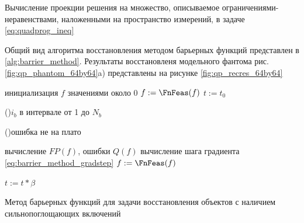 \begin{algorithm}[H]

\vspace{0.5cm}
\vspace{0.5cm}

 \caption{Вычисление проекции решения на множество, описываемое ограничениями-неравенствами, наложенными на пространство измерений, в задаче \eqref{eq:quadprog_ineq}}
 \label{alg:hough_barrier_projection}
\end{algorithm}

Общий вид алгоритма восстановления методом барьерных функций представлен в \ref{alg:barrier_method}.
Результаты восстановленя модельного фантома рис. \ref{fig:qp_phantom_64by64}a) представлены на рисунке \ref{fig:qp_recres_64by64}

\begin{algorithm}[H]
\vspace{0.5cm}



 инициализация $f$ значениями около 0 \;
 $f := \FnFeas(f)$ \;
 $t := t_0$ \;

 \For(){$i_b$ в интервале от 1 до $N_b$}{
  \While(){ошибка не на плато}{

  вычисление $FP(f)$, ошибки $Q(f)$ \;
  вычисление шага градиента \eqref{eq:barrier_method_gradstep}\;
  $f := \FnFeas(f)$\;
  }
  $t := t * \beta$ \;

 }

\vspace{0.5cm}
 \caption{Метод барьерных функций для задачи восстановления объектов с наличием сильнопоглощающих включений}
 \label{alg:barrier_method}
\end{algorithm}


